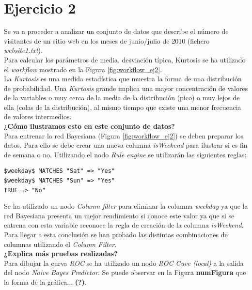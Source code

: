 \documentclass[10pt,a4paper]{article}
\begin{document}
\section{Ejercicio 2}

Se va a proceder a analizar un conjunto de datos que describe el número de visitantes de un sitio web en los meses de junio/julio de 2010 (fichero \emph{website1.txt}).\\

Para calcular los parámetros de media, desviación típica, Kurtosis se ha utilizado el \emph{workflow} mostrado en la Figura \ref{fig:workflow_ej2}.\\
La \emph{Kurtosis} es una medida estadística que muestra la forma de una distribución de probabilidad. Una \emph{Kurtosis} grande implica una mayor concentración de valores de la variables o muy cerca de la media de la distribución (pico) o muy lejos de ella (colas de la distribución), al mismo tiempo que existe una menor frecuencia de valores intermedios.\\
\textbf{¿Cómo ilustramos esto en este conjunto de datos?}\\

Para entrenar la red Bayesiana (Figura \ref{fig:workflow_ej2}) se deben preparar los datos. Para ello se debe crear una nueva columna \emph{isWeekend} para ilustrar si es fin de semana o no. Utilizando el nodo \emph{Rule engine} se utilizarán las siguientes reglas:

\begin{lstlisting}
$weekday$ MATCHES "Sat" => "Yes"
$weekday$ MATCHES "Sun" => "Yes"
TRUE => "No"
\end{lstlisting}

Se ha utilizado un nodo \emph{Column filter} para eliminar la columna \emph{weekday} ya que la red Bayesiana presenta un mejor rendimiento si conoce este valor ya que si se entrena con esta variable reconoce la regla de creación de la columna \emph{isWeekend}.\\
Para llegar a esta conclusión se han probado las distintas combinaciones de columnas utilizando el \emph{Column Filter}.\\
\textbf{¿Explica más pruebas realizadas?}\\

Para dibujar la curva \emph{ROC} se ha utilizado un nodo \emph{ROC Cuve (local)} a la salida del nodo \emph{Naive Bayes Predictor}. Se puede observar en la Figura \textbf{numFigura} que la forma de la gráfica... \textbf{(?)}.\\
\end{document}
